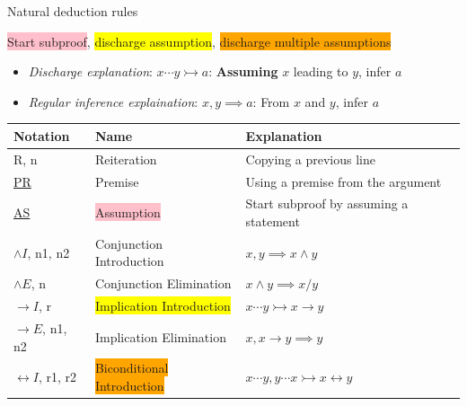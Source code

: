 \documentclass{article}
\begin{document}
\begin{definition}
    {Natural deduction rules}

    \colorbox{pink}{Start subproof}, \colorbox{yellow}{discharge assumption}, \colorbox{orange}{discharge multiple assumptions}

    \begin{itemize}
        \item \textit{Discharge explanation}: $x \cdots y \rightarrowtail a$: \textbf{Assuming} $x$ leading to $y$, infer $a$
        \item \textit{Regular inference explaination}: $x, y \implies a$: From $x$ and $y$, infer $a$
    \end{itemize}


    \begin{tabular}{l|lp{8cm}}
        \hline
        \textbf{Notation}           & \textbf{Name}                                 & \textbf{Explanation}                                                       \\
        \hline
        R, n                        & Reiteration                                   & Copying a previous line                                                    \\
        \underline{PR}              & Premise                                       & Using a premise from the argument                                          \\
        \underline{AS}              & \colorbox{pink}{Assumption}                   & Start subproof by assuming a statement                                     \\
        $\land I$, n1, n2           & Conjunction Introduction                      & $x, y \implies x \land y$                                                  \\
        $\land E$, n                & Conjunction Elimination                       & $x \land y \implies x / y$                                                 \\
        $\rightarrow I$, r          & \colorbox{yellow}{Implication Introduction}   & $x \cdots y \rightarrowtail x \rightarrow y$                               \\
        $\rightarrow E$, n1, n2     & Implication Elimination                       & $x, x \rightarrow y \implies y$                                            \\
        $\leftrightarrow I$, r1, r2 & \colorbox{orange}{Biconditional Introduction} & $x \cdots y, y \cdots x \rightarrowtail x \leftrightarrow y$               \\

\end{tabular}
\end{definition}
\end{document}
